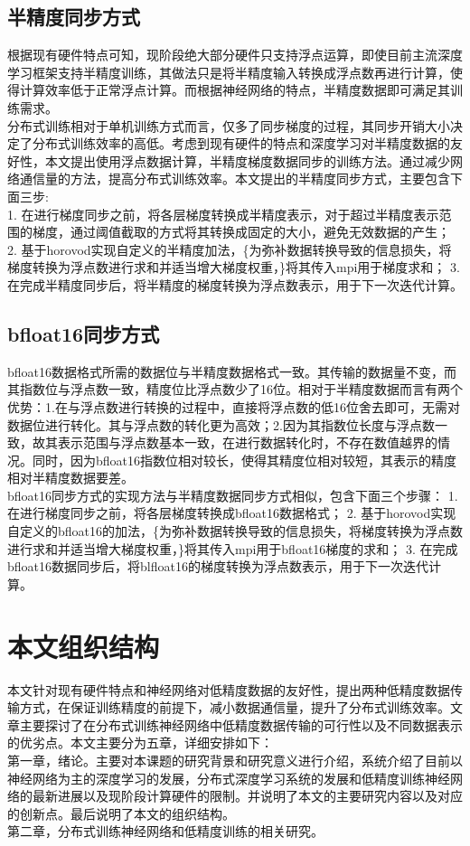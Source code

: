 \subsection{半精度同步方式}
根据现有硬件特点可知，现阶段绝大部分硬件只支持浮点运算，即使目前主流深度学习框架支持半精度训练，其做法只是将半精度输入转换成浮点数再进行计算，使得计算效率低于正常浮点计算。而根据神经网络的特点，半精度数据即可满足其训练需求。\\
分布式训练相对于单机训练方式而言，仅多了同步梯度的过程，其同步开销大小决定了分布式训练效率的高低。考虑到现有硬件的特点和深度学习对半精度数据的友好性，本文提出使用浮点数据计算，半精度梯度数据同步的训练方法。通过减少网络通信量的方法，提高分布式训练效率。本文提出的半精度同步方式，主要包含下面三步:\\
1. 在进行梯度同步之前，将各层梯度转换成半精度表示，对于超过半精度表示范围的梯度，通过阈值截取的方式将其转换成固定的大小，避免无效数据的产生；
2. 基于horovod实现自定义的半精度加法，\{为弥补数据转换导致的信息损失，将梯度转换为浮点数进行求和并适当增大梯度权重，\}将其传入mpi用于梯度求和；
3. 在完成半精度同步后，将半精度的梯度转换为浮点数表示，用于下一次迭代计算。

\subsection{bfloat16同步方式}
bfloat16数据格式所需的数据位与半精度数据格式一致。其传输的数据量不变，而其指数位与浮点数一致，精度位比浮点数少了16位。相对于半精度数据而言有两个优势：1.在与浮点数进行转换的过程中，直接将浮点数的低16位舍去即可，无需对数据位进行转化。其与浮点数的转化更为高效；2.因为其指数位长度与浮点数一致，故其表示范围与浮点数基本一致，在进行数据转化时，不存在数值越界的情况。同时，因为bfloat16指数位相对较长，使得其精度位相对较短，其表示的精度相对半精度数据要差。\\
bfloat16同步方式的实现方法与半精度数据同步方式相似，包含下面三个步骤：
1. 在进行梯度同步之前，将各层梯度转换成bfloat16数据格式；
2. 基于horovod实现自定义的bfloat16的加法，\{为弥补数据转换导致的信息损失，将梯度转换为浮点数进行求和并适当增大梯度权重，\}将其传入mpi用于bfloat16梯度的求和；
3. 在完成bfloat16数据同步后，将blfloat16的梯度转换为浮点数表示，用于下一次迭代计算。
\section{本文组织结构}
本文针对现有硬件特点和神经网络对低精度数据的友好性，提出两种低精度数据传输方式，在保证训练精度的前提下，减小数据通信量，提升了分布式训练效率。文章主要探讨了在分布式训练神经网络中低精度数据传输的可行性以及不同数据表示的优劣点。本文主要分为五章，详细安排如下：\\
第一章，绪论。主要对本课题的研究背景和研究意义进行介绍，系统介绍了目前以神经网络为主的深度学习的发展，分布式深度学习系统的发展和低精度训练神经网络的最新进展以及现阶段计算硬件的限制。并说明了本文的主要研究内容以及对应的创新点。最后说明了本文的组织结构。\\
第二章，分布式训练神经网络和低精度训练的相关研究。








